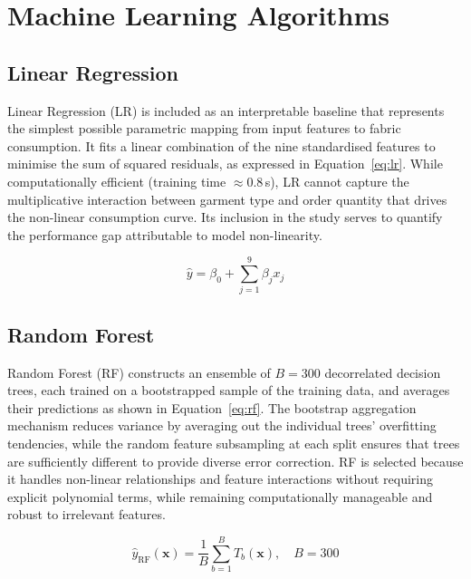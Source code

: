 \secdiv
\section{Machine Learning Algorithms}

\subsection{Linear Regression}
Linear Regression (LR) is included as an interpretable baseline that represents the simplest possible parametric mapping from input features to fabric consumption. It fits a linear combination of the nine standardised features to minimise the sum of squared residuals, as expressed in Equation~\ref{eq:lr}. While computationally efficient (training time $\approx$0.8\,s), LR cannot capture the multiplicative interaction between garment type and order quantity that drives the non-linear consumption curve. Its inclusion in the study serves to quantify the performance gap attributable to model non-linearity.

\begin{mdframed}[style=eqbox]
\begin{equation}\hat{y}=\beta_0+\sum_{j=1}^{9}\beta_j x_j\label{eq:lr}\end{equation}
\end{mdframed}

\subsection{Random Forest}
Random Forest (RF) constructs an ensemble of $B=300$ decorrelated decision trees, each trained on a bootstrapped sample of the training data, and averages their predictions as shown in Equation~\ref{eq:rf}. The bootstrap aggregation mechanism reduces variance by averaging out the individual trees' overfitting tendencies, while the random feature subsampling at each split ensures that trees are sufficiently different to provide diverse error correction. RF is selected because it handles non-linear relationships and feature interactions without requiring explicit polynomial terms, while remaining computationally manageable and robust to irrelevant features.

\begin{mdframed}[style=eqbox]
\begin{equation}\hat{y}_{\text{RF}}(\mathbf{x})=\frac{1}{B}\sum_{b=1}^{B}T_b(\mathbf{x}),\quad B=300\label{eq:rf}\end{equation}
\end{mdframed}

